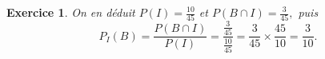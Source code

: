 \documentclass[10pt]{article}
\newtheorem{exo}{Exercice}
\begin{document}
\begin{exo}
\medskip

On en déduit $P(I)=\frac{10}{45}$ et $P(B\cap I)=\frac{3}{45},$ puis
\[P_I(B)=\frac{P(B\cap I)}{P(I)}=\frac{\frac{3}{45}}{\frac{10}{45}}=\frac{3}{45}\times \frac{45}{10}
=\frac{3}{10}
.\]





\end{exo}
\end{document}
